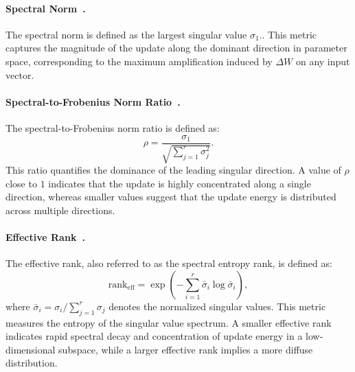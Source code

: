 \documentclass{llmxive}
\begin{document}
\paragraph{Spectral Norm~\citep{MATHIAS1990269}.}
The spectral norm is defined as the largest singular value $\sigma_1.$. This metric captures the magnitude of the update along the dominant direction in parameter space, corresponding to the maximum amplification induced by $\Delta W$ on any input vector.

\paragraph{Spectral-to-Frobenius Norm Ratio~\citep{ALNATOOR2024e30056}.}
The spectral-to-Frobenius norm ratio is defined as:
\begin{equation}
\rho = \frac{\sigma_1}{\sqrt{\sum_{j=1}^r \sigma_j^2}}.
\end{equation}
This ratio quantifies the dominance of the leading singular direction. A value of $\rho$ close to $1$ indicates that the update is highly concentrated along a single direction, whereas smaller values suggest that the update energy is distributed across multiple directions.

\paragraph{Effective Rank~\citep{item_f3c74b8f1cad43ed869604b318d58703}.}
The effective rank, also referred to as the spectral entropy rank, is defined as:
\begin{equation}
\mathrm{rank}_{\mathrm{eff}} = \exp\left(-\sum_{i=1}^r \bar{\sigma}_i \log \bar{\sigma}_i\right),
\end{equation}
where $\bar{\sigma}_i = \sigma_i / \sum_{j=1}^r \sigma_j$ denotes the normalized singular values. This metric measures the entropy of the singular value spectrum. A smaller effective rank indicates rapid spectral decay and concentration of update energy in a low-dimensional subspace, while a larger effective rank implies a more diffuse distribution.
\end{document}

